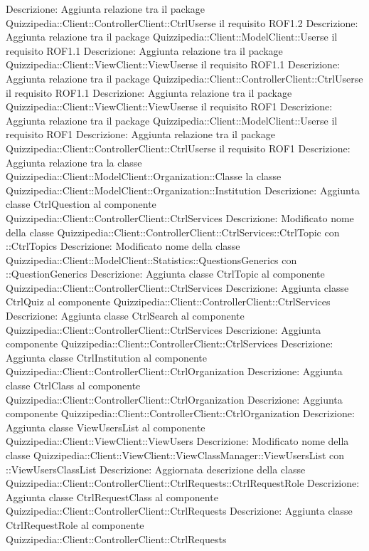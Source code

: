 Descrizione: Aggiunta relazione tra il package Quizzipedia::Client::ControllerClient::CtrlUserse il requisito ROF1.2 
Descrizione: Aggiunta relazione tra il package Quizzipedia::Client::ModelClient::Userse il requisito ROF1.1 
Descrizione: Aggiunta relazione tra il package Quizzipedia::Client::ViewClient::ViewUserse il requisito ROF1.1 
Descrizione: Aggiunta relazione tra il package Quizzipedia::Client::ControllerClient::CtrlUserse il requisito ROF1.1 
Descrizione: Aggiunta relazione tra il package Quizzipedia::Client::ViewClient::ViewUserse il requisito ROF1 
Descrizione: Aggiunta relazione tra il package Quizzipedia::Client::ModelClient::Userse il requisito ROF1 
Descrizione: Aggiunta relazione tra il package Quizzipedia::Client::ControllerClient::CtrlUserse il requisito ROF1 
Descrizione: Aggiunta relazione tra la classe Quizzipedia::Client::ModelClient::Organization::Classe la classe Quizzipedia::Client::ModelClient::Organization::Institution 
Descrizione: Aggiunta classe CtrlQuestion al componente Quizzipedia::Client::ControllerClient::CtrlServices 
Descrizione: Modificato nome della classe Quizzipedia::Client::ControllerClient::CtrlServices::CtrlTopic con ::CtrlTopics 
Descrizione: Modificato nome della classe Quizzipedia::Client::ModelClient::Statistics::QuestionsGenerics con ::QuestionGenerics 
Descrizione: Aggiunta classe CtrlTopic al componente Quizzipedia::Client::ControllerClient::CtrlServices 
Descrizione: Aggiunta classe CtrlQuiz al componente Quizzipedia::Client::ControllerClient::CtrlServices 
Descrizione: Aggiunta classe CtrlSearch al componente Quizzipedia::Client::ControllerClient::CtrlServices 
Descrizione: Aggiunta componente Quizzipedia::Client::ControllerClient::CtrlServices 
Descrizione: Aggiunta classe CtrlInstitution al componente Quizzipedia::Client::ControllerClient::CtrlOrganization 
Descrizione: Aggiunta classe CtrlClass al componente Quizzipedia::Client::ControllerClient::CtrlOrganization 
Descrizione: Aggiunta componente Quizzipedia::Client::ControllerClient::CtrlOrganization 
Descrizione: Aggiunta classe ViewUsersList al componente Quizzipedia::Client::ViewClient::ViewUsers 
Descrizione: Modificato nome della classe Quizzipedia::Client::ViewClient::ViewClassManager::ViewUsersList con ::ViewUsersClassList 
Descrizione: Aggiornata descrizione della classe Quizzipedia::Client::ControllerClient::CtrlRequests::CtrlRequestRole 
Descrizione: Aggiunta classe CtrlRequestClass al componente Quizzipedia::Client::ControllerClient::CtrlRequests 
Descrizione: Aggiunta classe CtrlRequestRole al componente Quizzipedia::Client::ControllerClient::CtrlRequests 
